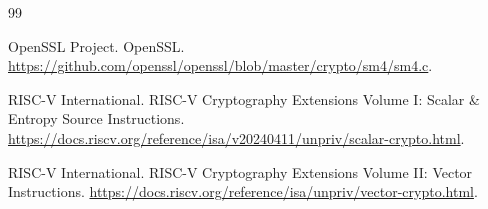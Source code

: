 \begin{thebibliography}{99}

OpenSSL Project.
\newblock OpenSSL.
\newblock \url{https://github.com/openssl/openssl/blob/master/crypto/sm4/sm4.c}.

RISC-V International.
\newblock RISC-V Cryptography Extensions Volume I: Scalar \& Entropy Source Instructions.
\newblock \url{https://docs.riscv.org/reference/isa/v20240411/unpriv/scalar-crypto.html}.

RISC-V International.
\newblock RISC-V Cryptography Extensions Volume II: Vector Instructions.
\newblock \url{https://docs.riscv.org/reference/isa/unpriv/vector-crypto.html}.

\end{thebibliography}
